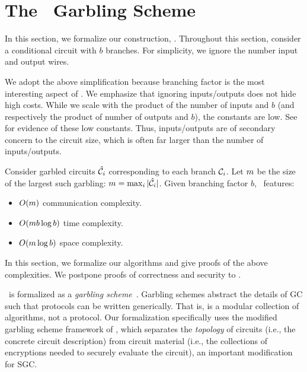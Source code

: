 \section{The \ourschemelong\ Garbling Scheme}\label{sec:approach}
In this section, we formalize our construction, \ourschemelong.
Throughout this section, consider a conditional circuit with $b$
branches.
For simplicity, we ignore the number input and output wires.

We adopt the above simplification because branching factor is the most interesting
aspect of \ourschemelong. We emphasize that ignoring inputs/outputs
does not hide high costs.
While we scale with the product of the number of inputs and $b$ (and
respectively the product of number of outputs and $b$), the
constants are low.
See  for evidence of these low constants.
Thus, inputs/outputs are of secondary concern to the circuit size,
which is often far larger than the number of inputs/outputs.

Consider garbled circuits $\hat{\mathcal C}_i$ corresponding to each branch
$\mathcal C_i$. Let $m$ be the size of the largest such garbling: $m
= \max_i |\hat{\mathcal C}_i|$.
Given branching factor $b$, \ourschemelong\ features:
\begin{itemize}
  \item $O(m)$ communication complexity.
  \item $O(m b \log b)$ time complexity.
  \item $O(m \log b)$ space complexity.
\end{itemize}

In this section, we formalize our algorithms and give proofs of the above
complexities. We postpone proofs of correctness and security to
.

\ourschemelong\ is formalized as a \emph{garbling
scheme}~\cite{CCS:BelHoaRog12}.
Garbling schemes abstract the details of GC such that protocols can be written generically.
That is, \ourschemelong is a modular collection of algorithms, not a
protocol.
Our formalization specifically uses the modified garbling scheme
framework of \HK, which separates the \emph{topology} of circuits
(i.e., the concrete circuit description) from circuit material
(i.e., the collections of encryptions needed to securely evaluate the
circuit), an important modification for SGC.

